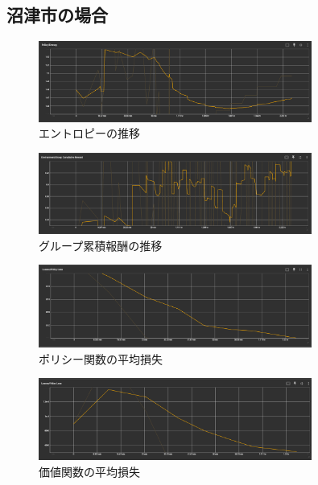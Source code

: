 \subsection{沼津市の場合}
\begin{figure}[H] 
  \centering 
  \includegraphics[width=0.8\textwidth]{Figures/NumazuEntropy.png}
  \caption{エントロピーの推移} 
  \label{fig:fig-01}
\end{figure}
\begin{figure}[H] 
  \centering 
  \includegraphics[width=0.8\textwidth]{Figures/NumazuGroupReward.png}
  \caption{グループ累積報酬の推移} 
  \label{fig:fig-01}
\end{figure}
\begin{figure}[H] 
  \centering 
  \includegraphics[width=0.8\textwidth]{Figures/NumazuPolicyLoss.png}
  \caption{ポリシー関数の平均損失} 
  \label{fig:fig-01}
\end{figure}
\begin{figure}[H] 
  \centering 
  \includegraphics[width=0.8\textwidth]{Figures/NumazuValueLoss.png}
  \caption{価値関数の平均損失} 
  \label{fig:fig-01}
\end{figure}